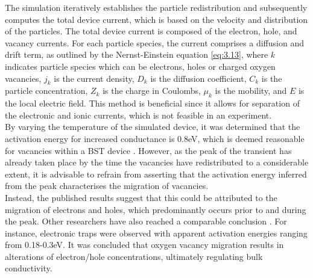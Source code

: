 \noindent The simulation iteratively establishes the particle redistribution and subsequently computes the total device current, which is based on the velocity and distribution of the particles. The total device current is composed of the electron, hole, and vacancy currents. For each particle species, the current comprises a diffusion and drift term, as outlined by the Nernst-Einstein equation \ref{eq:3.13}, where $k$ indicates particle species which can be electrons, holes or charged oxygen vacancies, $j_k$ is the current density, $D_k$ is the diffusion coefficient, $C_k$ is the particle concentration, $Z_k$ is the charge in Coulombs, $\mu_k$ is the mobility, and $E$ is the local electric field. This method is beneficial since it allows for separation of the electronic and ionic currents, which is not feasible in an experiment. \\



\noindent By varying the temperature of the simulated device, it was determined that the activation energy for increased conductance is 0.8eV, which is deemed reasonable for vacancies within a BST device \cite{zhong2010transient}. However, as the peak of the transient has already taken place by the time the vacancies have redistributed to a considerable extent, it is advisable to refrain from asserting that the activation energy inferred from the peak characterises the migration of vacancies. \\

\noindent Instead, the published results suggest that this could be attributed to the migration of electrons and holes, which predominantly occurs prior to and during the peak. Other researchers have also reached a comparable conclusion \cite{zhong2010transient}. For instance, electronic traps were observed with apparent activation energies ranging from 0.18-0.3eV. It was concluded that oxygen vacancy migration results in alterations of electron/hole concentrations, ultimately regulating bulk conductivity. \\

